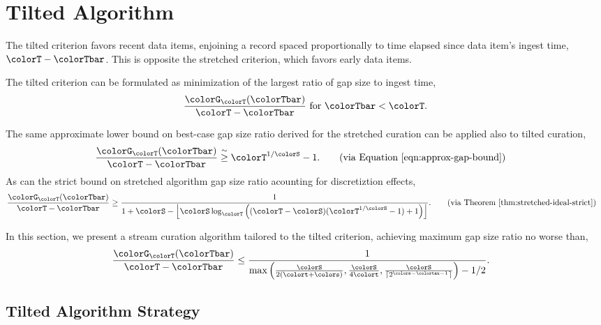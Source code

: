 \section{Tilted Algorithm} \label{sec:tilted}

The tilted criterion favors recent data items, enjoining a record spaced proportionally to time elapsed since data item's ingest time, $\colorT - \colorTbar$.
This is opposite the stretched criterion, which favors early data items.

The tilted criterion can be formulated as minimization of the largest ratio of gap size to ingest time,
\begin{align*}
\frac{\colorG_{\colorT}(\colorTbar)}{\colorT - \colorTbar} \text{ for } \colorTbar < \colorT.
\end{align*}

The same approximate lower bound on best-case gap size ratio derived for the stretched curation can be applied also to tilted curation,
\begin{align*}
\frac{\colorG_{\colorT}(\colorTbar)}{\colorT - \colorTbar}
&\stackrel{\sim}{\geq}
\colorT^{1/\colorS} - 1.
\tag{via Equation \ref{eqn:approx-gap-bound}}
\end{align*}
As can the strict bound on stretched algorithm gap size ratio acounting for discretiztion effects,
\begin{align*}
\frac{\colorG_{\colorT}(\colorTbar)}{\colorT - \colorTbar}
&\geq
\frac{
  1
}{
  1 + \colorS
  - \left\lfloor \colorS \log_{\colorT}\Big(
    (\colorT - \colorS)(\colorT^{1/\colorS} - 1) + 1
  \Big)\right\rfloor
}.
\tag{via Theorem \ref{thm:stretched-ideal-strict}}
\end{align*}

In this section, we present a stream curation algorithm tailored to the tilted criterion, achieving maximum gap size ratio no worse than,
\begin{align*}
  \frac{\colorG_{\colorT}(\colorTbar)}{\colorT - \colorTbar}
  &\leq
  \frac{
    1
  }{
    \max\Big(
      \frac{\colorS}{2(\colort + \colors)},
      \frac{\colorS}{4\colort},
      \frac{\colorS}{\left\lceil 2^{\colors - \colortau - 1} \right\rceil}
    \Big)
    - 1/2
  }.
\end{align*}

\subsection{Tilted Algorithm Strategy}
\label{sec:tilted-strategy}

